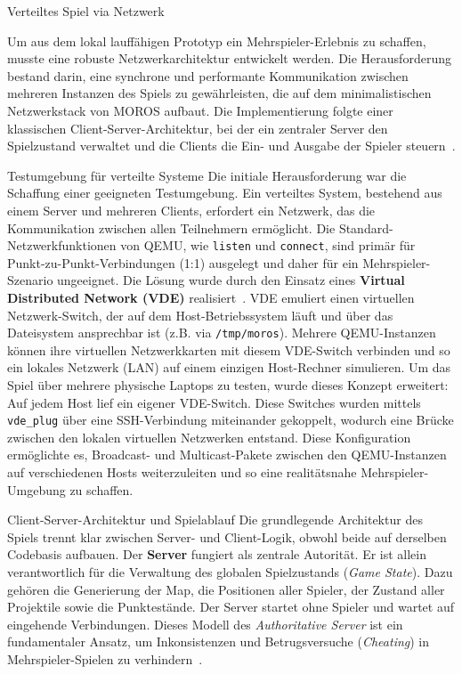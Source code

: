 \begin{section}{Verteiltes Spiel via Netzwerk}

Um aus dem lokal lauffähigen Prototyp ein Mehrspieler-Erlebnis zu schaffen, musste eine robuste Netzwerkarchitektur entwickelt werden.
Die Herausforderung bestand darin, eine synchrone und performante Kommunikation zwischen mehreren Instanzen des Spiels zu gewährleisten, die auf dem minimalistischen Netzwerkstack von MOROS aufbaut.
Die Implementierung folgte einer klassischen Client-Server-Architektur, bei der ein zentraler Server den Spielzustand verwaltet und die Clients die Ein- und Ausgabe der Spieler steuern~\cite{gambetta2014client_server}.
\begin{subsection}{Testumgebung für verteilte Systeme}
Die initiale Herausforderung war die Schaffung einer geeigneten Testumgebung.
Ein verteiltes System, bestehend aus einem Server und mehreren Clients, erfordert ein Netzwerk, das die Kommunikation zwischen allen Teilnehmern ermöglicht.
Die Standard-Netzwerkfunktionen von QEMU, wie \texttt{listen} und \texttt{connect}, sind primär für Punkt-zu-Punkt-Verbindungen (1:1) ausgelegt und daher für ein Mehrspieler-Szenario ungeeignet.
Die Lösung wurde durch den Einsatz eines \textbf{Virtual Distributed Network (VDE)} realisiert~\cite{vde_project}.
VDE emuliert einen virtuellen Netzwerk-Switch, der auf dem Host-Betriebssystem läuft und über das Dateisystem ansprechbar ist (z.B. via \texttt{/tmp/moros}).
Mehrere QEMU-Instanzen können ihre virtuellen Netzwerkkarten mit diesem VDE-Switch verbinden und so ein lokales Netzwerk (LAN) auf einem einzigen Host-Rechner simulieren.
Um das Spiel über mehrere physische Laptops zu testen, wurde dieses Konzept erweitert: Auf jedem Host lief ein eigener VDE-Switch.
Diese Switches wurden mittels \texttt{vde\_plug} über eine SSH-Verbindung miteinander gekoppelt, wodurch eine Brücke zwischen den lokalen virtuellen Netzwerken entstand.
Diese Konfiguration ermöglichte es, Broadcast- und Multicast-Pakete zwischen den QEMU-Instanzen auf verschiedenen Hosts weiterzuleiten und so eine realitätsnahe Mehrspieler-Umgebung zu schaffen.
\end{subsection}

\begin{subsection}{Client-Server-Architektur und Spielablauf}
Die grundlegende Architektur des Spiels trennt klar zwischen Server- und Client-Logik, obwohl beide auf derselben Codebasis aufbauen.
Der \textbf{Server} fungiert als zentrale Autorität. Er ist allein verantwortlich für die Verwaltung des globalen Spielzustands (\emph{Game State}).
Dazu gehören die Generierung der Map, die Positionen aller Spieler, der Zustand aller Projektile sowie die Punktestände.
Der Server startet ohne Spieler und wartet auf eingehende Verbindungen. Dieses Modell des \emph{Authoritative Server} ist ein fundamentaler Ansatz, um Inkonsistenzen und Betrugsversuche (\emph{Cheating}) in Mehrspieler-Spielen zu verhindern~\cite{gambetta2014client_server}.


\end{subsection}
\end{section}
